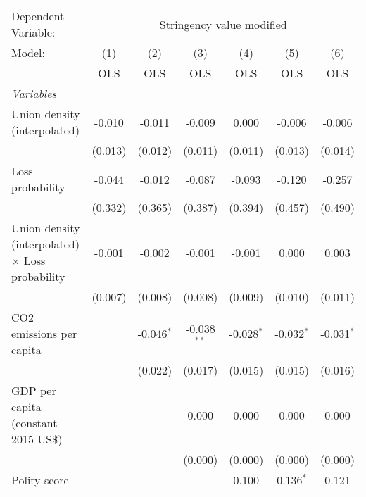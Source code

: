
\begingroup
\centering
\begin{tabular}{lcccccc}
   \toprule
   Dependent Variable: & \multicolumn{6}{c}{Stringency value modified}\\
   Model:                                                  & (1)     & (2)          & (3)           & (4)          & (5)          & (6)\\  
                                                           &  OLS    & OLS          & OLS           & OLS          & OLS          & OLS\\  
   \midrule
   \emph{Variables}\\
   Union density (interpolated)                            & -0.010  & -0.011       & -0.009        & 0.000        & -0.006       & -0.006\\   
                                                           & (0.013) & (0.012)      & (0.011)       & (0.011)      & (0.013)      & (0.014)\\   
   Loss probability                                        & -0.044  & -0.012       & -0.087        & -0.093       & -0.120       & -0.257\\   
                                                           & (0.332) & (0.365)      & (0.387)       & (0.394)      & (0.457)      & (0.490)\\   
   Union density (interpolated) $\times$ Loss probability  & -0.001  & -0.002       & -0.001        & -0.001       & 0.000        & 0.003\\   
                                                           & (0.007) & (0.008)      & (0.008)       & (0.009)      & (0.010)      & (0.011)\\   
   CO2 emissions per capita                                &         & -0.046$^{*}$ & -0.038$^{**}$ & -0.028$^{*}$ & -0.032$^{*}$ & -0.031$^{*}$\\   
                                                           &         & (0.022)      & (0.017)       & (0.015)      & (0.015)      & (0.016)\\   
   GDP per capita (constant 2015 US\$)                     &         &              & 0.000         & 0.000        & 0.000        & 0.000\\   
                                                           &         &              & (0.000)       & (0.000)      & (0.000)      & (0.000)\\   
   Polity score                                            &         &              &               & 0.100        & 0.136$^{*}$  & 0.121\\   

\end{tabular}
